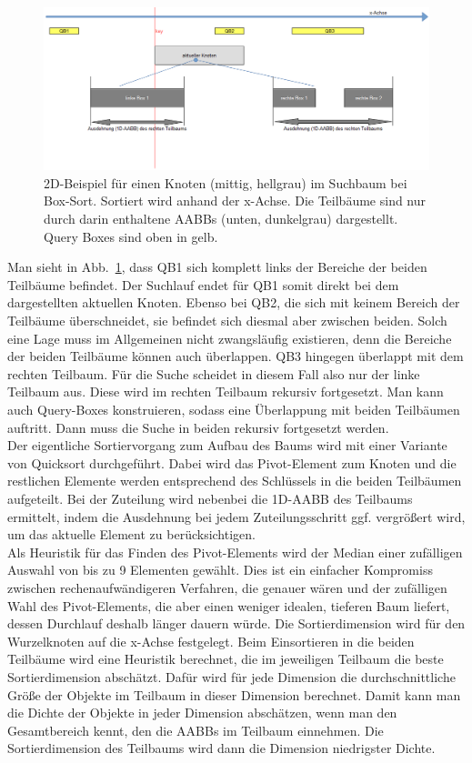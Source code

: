 \begin{figure}
    \centering
    \includegraphics[width=1.0\textwidth]{./res/BoxsortNode.png}
    \caption{2D-Beispiel für einen Knoten (mittig, hellgrau) im Suchbaum bei Box-Sort. Sortiert wird anhand der x-Achse. Die Teilbäume sind nur durch darin enthaltene AABBs (unten, dunkelgrau) dargestellt. Query Boxes sind oben in gelb.}
    \label{fig:boxsortNode}
\end{figure}

Man sieht in Abb.~\ref{fig:boxsortNode}, dass QB1 sich komplett links der Bereiche der beiden Teilbäume befindet. Der Suchlauf endet für QB1 somit direkt bei dem dargestellten aktuellen Knoten. Ebenso bei QB2, die sich mit keinem Bereich der Teilbäume überschneidet, sie befindet sich diesmal aber zwischen beiden. Solch eine Lage muss im Allgemeinen nicht zwangsläufig existieren, denn die Bereiche der beiden Teilbäume können auch überlappen. QB3 hingegen überlappt mit dem rechten Teilbaum. Für die Suche scheidet in diesem Fall also nur der linke Teilbaum aus. Diese wird im rechten Teilbaum rekursiv fortgesetzt. Man kann auch Query-Boxes konstruieren, sodass eine Überlappung mit beiden Teilbäumen auftritt. Dann muss die Suche in beiden rekursiv fortgesetzt werden.\\

Der eigentliche Sortiervorgang zum Aufbau des Baums wird mit einer Variante von Quicksort durchgeführt. Dabei wird das Pivot-Element zum Knoten und die restlichen Elemente werden entsprechend des Schlüssels in die beiden Teilbäumen aufgeteilt. Bei der Zuteilung wird nebenbei die 1D-AABB des Teilbaums ermittelt, indem die Ausdehnung bei jedem Zuteilungsschritt ggf. vergrößert wird, um das aktuelle Element zu berücksichtigen.\\
Als Heuristik für das Finden des Pivot-Elements wird der Median einer zufälligen Auswahl von bis zu 9 Elementen gewählt. Dies ist ein einfacher Kompromiss zwischen rechenaufwändigeren Verfahren, die genauer wären und der zufälligen Wahl des Pivot-Elements, die aber einen weniger idealen, tieferen Baum liefert, dessen Durchlauf deshalb länger dauern würde. Die Sortierdimension wird für den Wurzelknoten auf die x-Achse festgelegt. 
Beim Einsortieren in die beiden Teilbäume wird eine Heuristik berechnet, die im jeweiligen Teilbaum die beste Sortierdimension abschätzt. Dafür wird für jede Dimension die durchschnittliche Größe der Objekte im Teilbaum in dieser Dimension berechnet. Damit kann man die Dichte der Objekte in jeder Dimension abschätzen, wenn man den Gesamtbereich kennt, den die AABBs im Teilbaum einnehmen. Die Sortierdimension des Teilbaums wird dann die Dimension niedrigster Dichte.\\


